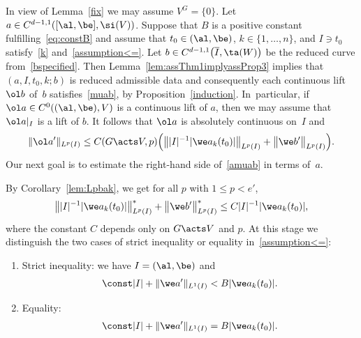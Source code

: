 In view of Lemma~\ref{fix} we may assume $V^G = \{0\}$.
Let $a \in C^{d-1,1}([\al,\be],\si(V))$. Suppose that $B$ is a positive constant fulfilling~\eqref{eq:constB} and
assume that
$t_0 \in (\al,\be)$, $k \in \{1,\dots,n\}$, and $I \ni t_0$
satis\-fy~\eqref{k} and~\eqref{assumption<=}.
Let $b \in C^{d-1,1}\big(\overline I, \ta(W)\big)$ be the reduced curve from~\eqref{bspecified}.
Then Lemma~\ref{lem:assThm1implyassProp3} implies that $(a,I,t_0,k;b)$ is reduced admissible data and
consequently each continuous lift $\ol b$ of~$b$ satisfies~\eqref{muab}, by Proposition~\ref{induction}. In~particular, if~$\ol a \in C^0((\al,\be),V)$ is a continuous lift of $a$, then we may assume
that $\ol a|_I$ is a lift of $b$.
It follows that $\ol a$ is absolutely continuous on~$I$ and
\begin{gather} \label{amuab}
 	\|\ol a'\|_{L^p(I)} \le C(G \acts V,p) \Big( \big\| |I|^{-1} {|\we a_k(t_0)|} \big\|_{L^p (I)}
 + \big\|\we b'\big\|_{L^p (I)}\Big).
 \end{gather}
Our next goal is to estimate the right-hand side of~\eqref{amuab} in terms of~$a$.

By Corollary~\ref{lem:Lpbak},
we get for all $p$ with $1 \le p < e'$,
\begin{gather} \label{beforecases}
 \big\||I|^{-1} |\we a_k (t_0)| \big\|^*_{L^p (I)} + \big\|\we b'\big\|^*_{L^p(I)}
 \le C |I|^{-1} |\we a_k (t_0)|,
\end{gather}
where the constant $C$ depends only on $G \acts V$ and $p$.
At this stage we distinguish the two cases of strict inequality or equality in~\eqref{assumption<=}:
\begin{enumerate}
 \item[$(i)$] Strict inequality: we have $I = (\al,\be)$ and
 \begin{gather}\label{assumption<}
 \const |I| + \|\we a'\|_{L^1 (I)} < B |\we a_k(t_0)|.
 \end{gather}
 \item[$(ii)$] Equality:
 \begin{gather}\label{assumption=}
 \const |I| + \|\we a'\|_{L^1 (I)} = B |\we a_k(t_0)|.
 \end{gather}
\end{enumerate}

